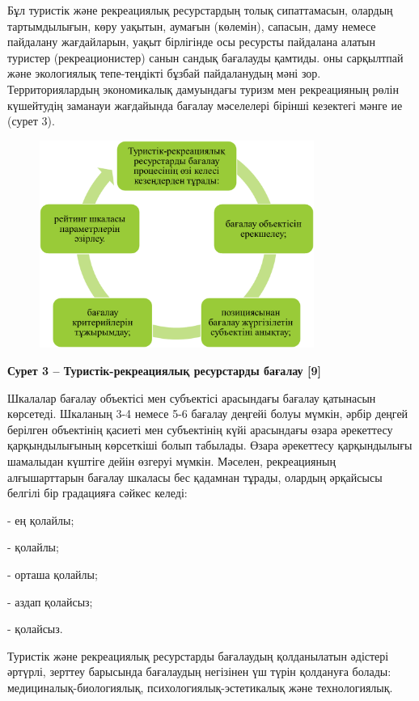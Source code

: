 Бұл туристік және рекреациялық ресурстардың толық сипаттамасын, олардың
тартымдылығын, көру уақытын, аумағын (көлемін), сапасын, даму немесе
пайдалану жағдайларын, уақыт бірлігінде осы ресурсты пайдалана алатын
туристер (рекреационистер) санын сандық бағалауды қамтиды. оны
сарқылтпай және экологиялық тепе-теңдікті бұзбай пайдаланудың мәні зор.
Территориялардың экономикалық дамуындағы туризм мен рекреацияның рөлін
күшейтудің заманауи жағдайында бағалау мәселелері бірінші кезектегі
мәнге ие (сурет 3).

\begin{figure}[H]
	\centering
	\includegraphics[width=0.8\textwidth]{assets/1113}
	\caption*{}
\end{figure}

{\bfseries Сурет 3 -- Туристік-рекреациялық ресурстарды бағалау {[}9{]}}

Шкалалар бағалау объектісі мен субъектісі арасындағы бағалау қатынасын
көрсетеді. Шкаланың 3-4 немесе 5-6 бағалау деңгейі болуы мүмкін, әрбір
деңгей берілген объектінің қасиеті мен субъектінің күйі арасындағы өзара
әрекеттесу қарқындылығының көрсеткіші болып табылады. Өзара әрекеттесу
қарқындылығы шамалыдан күштіге дейін өзгеруі мүмкін. Мәселен,
рекреацияның алғышарттарын бағалау шкаласы бес қадамнан тұрады, олардың
әрқайсысы белгілі бір градацияға сәйкес келеді:

- ең қолайлы;

- қолайлы;

- орташа қолайлы;

- аздап қолайсыз;

- қолайсыз.

Туристік және рекреациялық ресурстарды бағалаудың қолданылатын әдістері
әртүрлі, зерттеу барысында бағалаудың негізінен үш түрін қолдануға
болады: медициналық-биологиялық, психологиялық-эстетикалық және
технологиялық.


